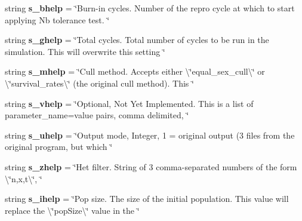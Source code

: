 \begin{DoxyCompactItemize}
\item 
string {\bfseries s\+\_\+bhelp} = \char`\"{}Burn-\/in cycles. Number of the repro cycle at which to start applying Nb tolerance test. \char`\"{}\hypertarget{namespacenegui_1_1pgdrivesimulation_a901f02095e584a1d148f9a772f81c402}{}\label{namespacenegui_1_1pgdrivesimulation_a901f02095e584a1d148f9a772f81c402}

\item 
string {\bfseries s\+\_\+ghelp} = \char`\"{}Total cycles. Total number of cycles to be run in the simulation. This will overwrite this setting \char`\"{}\hypertarget{namespacenegui_1_1pgdrivesimulation_a71a183f31e95360288cf754422221ffd}{}\label{namespacenegui_1_1pgdrivesimulation_a71a183f31e95360288cf754422221ffd}

\item 
string {\bfseries s\+\_\+mhelp} = \char`\"{}Cull method. Accepts either \textbackslash{}\char`\"{}equal\+\_\+sex\+\_\+cull\textbackslash{}\char`\"{} or \textbackslash{}\char`\"{}survival\+\_\+rates\textbackslash{}\char`\"{} (the original cull method). This \char`\"{}\hypertarget{namespacenegui_1_1pgdrivesimulation_a896c782421281715243ca544ab0bf8f2}{}\label{namespacenegui_1_1pgdrivesimulation_a896c782421281715243ca544ab0bf8f2}

\item 
string {\bfseries s\+\_\+vhelp} = \char`\"{}Optional, Not Yet Implemented. This is a list of parameter\+\_\+name=value pairs, comma delimited, \char`\"{}\hypertarget{namespacenegui_1_1pgdrivesimulation_a89cbe7b98072c9efc530b308222b9e7e}{}\label{namespacenegui_1_1pgdrivesimulation_a89cbe7b98072c9efc530b308222b9e7e}

\item 
string {\bfseries s\+\_\+uhelp} = \char`\"{}Output mode, Integer, 1 = original output (3 files from the original program, but which \char`\"{}\hypertarget{namespacenegui_1_1pgdrivesimulation_afcd7575b81b7508cb4e7af6bfa7618f2}{}\label{namespacenegui_1_1pgdrivesimulation_afcd7575b81b7508cb4e7af6bfa7618f2}

\item 
string {\bfseries s\+\_\+zhelp} = \char`\"{}Het filter. String of 3 comma-\/separated numbers of the form \textbackslash{}\char`\"{}n,x,t\textbackslash{}\char`\"{}, \char`\"{}\hypertarget{namespacenegui_1_1pgdrivesimulation_a672ea1baf58d518ec4fda0c0069c455f}{}\label{namespacenegui_1_1pgdrivesimulation_a672ea1baf58d518ec4fda0c0069c455f}

\item 
string {\bfseries s\+\_\+ihelp} = \char`\"{}Pop size. The size of the initial population. This value will replace the \textbackslash{}\char`\"{}pop\+Size\textbackslash{}\char`\"{} value in the \char`\"{}\hypertarget{namespacenegui_1_1pgdrivesimulation_a72df6ba1885c769b55d9a6b1c2ee2a20}{}\label{namespacenegui_1_1pgdrivesimulation_a72df6ba1885c769b55d9a6b1c2ee2a20}


\end{DoxyCompactItemize}

